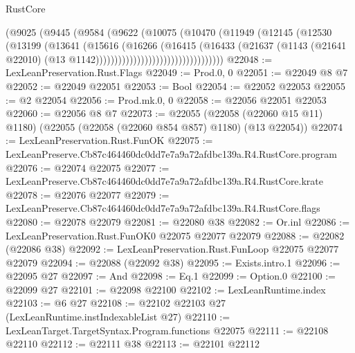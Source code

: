 \begin{lexlean}{RustCore}
\begin{coremodule}
                                    (@9025
                                      (@9445
                                        (@9584
                                          (@9622
                                            (@10075
                                              (@10470
                                                (@11949
                                                  (@12145
                                                    (@12530
                                                      (@13199
                                                        (@13641
                                                          (@15616
                                                            (@16266
                                                              (@16415
                                                                (@16433
                                                                  (@21637
                                                                    (@1143
                                                                      (@21641 @22010)
                                                                      (@13
                                                                        @1142))))))))))))))))))))))))))))))))))
@22048 := LexLeanPreservation.Rust.Flags
@22049 := Prod.{0, 0}
@22051 := @22049 @8 @7
@22052 := @22049 @22051
@22053 := Bool
@22054 := @22052 @22053
@22055 := @2 @22054
@22056 := Prod.mk.{0, 0}
@22058 := @22056 @22051 @22053
@22060 := @22056 @8 @7
@22073 := @22055
    (@22058 (@22060 @15 @11) @1180)
    (@22055 (@22058 (@22060 @854 @857) @1180) (@13 @22054))
@22074 := LexLeanPreservation.Rust.FunOK
@22075 := LexLeanPreserve.Cb87c464460dc0dd7e7a9a72afdbc139a.R4.RustCore.program
@22076 := @22074 @22075
@22077 := LexLeanPreserve.Cb87c464460dc0dd7e7a9a72afdbc139a.R4.RustCore.krate
@22078 := @22076 @22077
@22079 := LexLeanPreserve.Cb87c464460dc0dd7e7a9a72afdbc139a.R4.RustCore.flags
@22080 := @22078 @22079
@22081 := @22080 @38
@22082 := Or.inl
@22086 := LexLeanPreservation.Rust.FunOK0 @22075 @22077 @22079
@22088 := @22082 (@22086 @38)
@22092 := LexLeanPreservation.Rust.FunLoop @22075 @22077 @22079
@22094 := @22088 (@22092 @38)
@22095 := Exists.intro.{1}
@22096 := @22095 @27
@22097 := And
@22098 := Eq.{1}
@22099 := Option.{0}
@22100 := @22099 @27
@22101 := @22098 @22100
@22102 := LexLeanRuntime.index
@22103 := @6 @27
@22108 := @22102 @22103 @27 (LexLeanRuntime.instIndexableList @27)
@22110 := LexLeanTarget.TargetSyntax.Program.functions @22075
@22111 := @22108 @22110
@22112 := @22111 @38
@22113 := @22101 @22112

\end{coremodule}
\end{lexlean}
